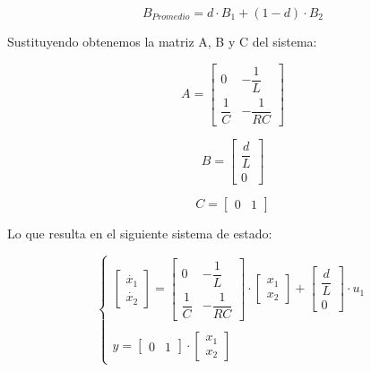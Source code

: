 \vspace{-0.5cm}
\begin{equation}
    B_{Promedio} = d \cdot B_1 + (1 - d) \cdot B_2
\end{equation}

Sustituyendo obtenemos la matriz A, B y C del sistema:

\begin{equation}
    A = \begin{bmatrix}
        0 & -\dfrac{1}{L}\\
        \dfrac{1}{C} & -\dfrac{1}{RC}
    \end{bmatrix}
\end{equation}

\begin{equation}
    B = \begin{bmatrix}
        \dfrac{d}{L}\\
        0
    \end{bmatrix}
\end{equation}

\begin{equation}
    C = \begin{bmatrix}
        0 & 1
    \end{bmatrix}
\end{equation}

Lo que resulta en el siguiente sistema de estado:

\vspace{-0.5cm}
\begin{equation}
    \begin{cases}
        \begin{bmatrix}
            \dot{x_1}\\
            \dot{x_2}
        \end{bmatrix}
        =
        \begin{bmatrix}
            0  &   -\dfrac{1}{L}\\
            \dfrac{1}{C} & -\dfrac{1}{RC}
        \end{bmatrix}
        \cdot
        \begin{bmatrix}
            x_1 \\
            x_2
        \end{bmatrix}
        +
        \begin{bmatrix}
            \dfrac{d}{L} \\
            0
        \end{bmatrix}
        \cdot
        u_1 
        \\
        \\
        y =
        \begin{bmatrix}
            0 & 1
        \end{bmatrix}
        \cdot
        \begin{bmatrix}
            x_1 \\
            x_2
        \end{bmatrix}

    \end{cases}
\end{equation}

